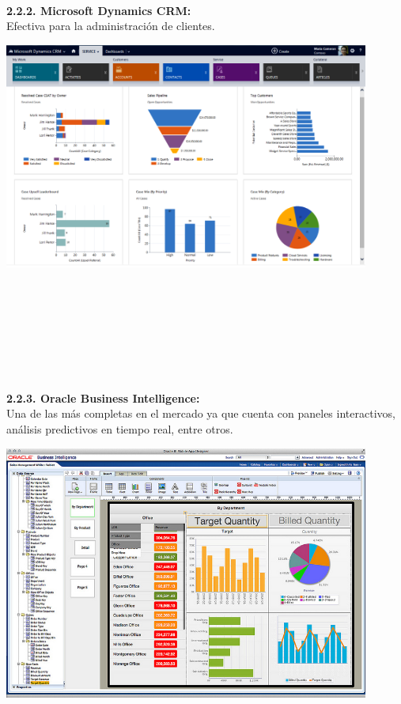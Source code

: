 \begin{flushleft}
\textbf{}\\
\textbf{2.2.2. Microsoft Dynamics CRM: }\\
Efectiva para la administración de clientes.
	\begin{center}
	\includegraphics[width=12cm]{./Imagenes/BIimagen2}
	\end{center}
	\textbf{}\\
\textbf{}\\
\textbf{}\\
\textbf{}\\

\textbf{}\\
\textbf{}\\
\textbf{}\\
\textbf{2.2.3. Oracle Business Intelligence: }\\
Una de las más completas en el mercado ya que cuenta con paneles interactivos, análisis predictivos en tiempo real, entre otros.
	\begin{center}
	\includegraphics[width=12cm]{./Imagenes/BIimagen3}
	\end{center}
	\textbf{}\\


\end{flushleft}
